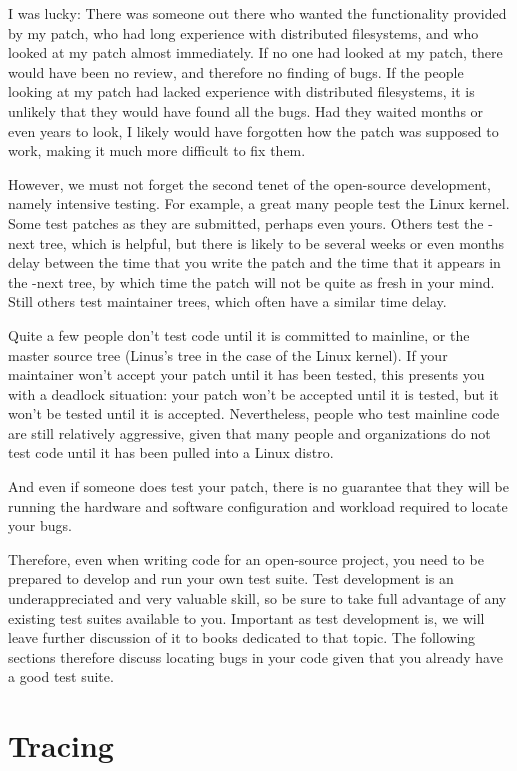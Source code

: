 I was lucky:  There was someone out there who wanted the functionality
provided by my patch, who had long experience with distributed filesystems,
and who looked at my patch almost immediately.
If no one had looked at my patch, there would have been no review, and
therefore no finding of bugs.
If the people looking at my patch had lacked experience with distributed
filesystems, it is unlikely that they would have found all the bugs.
Had they waited months or even years to look, I likely would have forgotten
how the patch was supposed to work, making it much more difficult to
fix them.

However, we must not forget the second tenet of the open-source development,
namely intensive testing.
For example, a great many people test the Linux kernel.
Some test patches as they are submitted, perhaps even yours.
Others test the -next tree, which is helpful, but there is likely to be
several weeks or even months delay between the time that you write the
patch and the time that it appears in the -next tree, by which time the
patch will not be quite as fresh in your mind.
Still others test maintainer trees, which often have a similar time delay.

Quite a few people don't test code until it is committed to mainline,
or the master source tree (Linus's tree in the case of the Linux kernel).
If your maintainer won't accept your patch until it has been tested,
this presents you with a deadlock situation: your patch won't be accepted
until it is tested, but it won't be tested until it is accepted.
Nevertheless, people who test mainline code are still relatively
aggressive, given that many people and organizations do not test code
until it has been pulled into a Linux distro.

And even if someone does test your patch, there is no guarantee that they
will be running the hardware and software configuration and workload
required to locate your bugs.

Therefore, even when writing code for an open-source project, you need to
be prepared to develop and run your own test suite.
Test development is an underappreciated and very valuable skill, so be
sure to take full advantage of any existing test suites available to
you.
Important as test development is, we will leave further discussion of it
to books dedicated to that topic.
The following sections therefore discuss locating bugs in your code given that
you already have a good test suite.

\section{Tracing}
\label{sec:debugging:Tracing}

